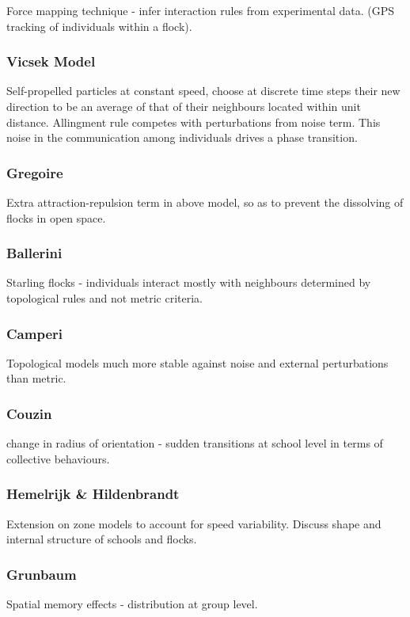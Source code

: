 \documentclass[10pt,twocolumn]{revtex4-2}    %
\begin{document}
Force mapping technique - infer interaction rules from experimental data. (GPS tracking of individuals within a flock).

\subsubsection{Vicsek Model}
Self-propelled particles at constant speed, choose at discrete time steps their new direction to be an average of that of their neighbours located within unit distance. Allingment rule competes with perturbations from noise term. This noise in the communication among individuals drives a phase transition.

\subsubsection{Gregoire}
Extra attraction-repulsion term in above model, so as to prevent the dissolving of flocks in open space.

\subsubsection{Ballerini}
Starling flocks - individuals interact mostly with neighbours determined by topological rules and not metric criteria.

\subsubsection{Camperi} 
Topological models much more stable against noise and external perturbations than metric.

\subsubsection{Couzin}
change in radius of orientation - sudden transitions at school level in terms of collective behaviours. 

\subsubsection{Hemelrijk \& Hildenbrandt}
Extension on zone models to account for speed variability. Discuss shape and internal structure of schools and flocks.

\subsubsection{Grunbaum}
Spatial memory effects - distribution at group level.
\end{document}
